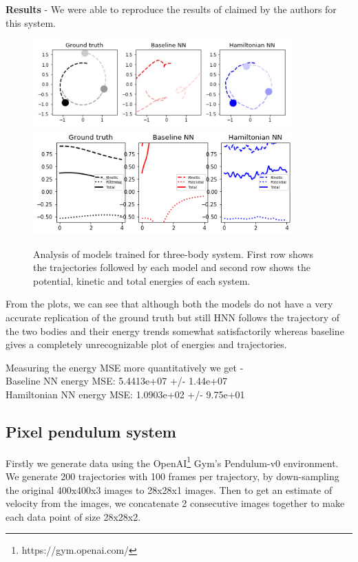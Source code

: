 \textbf{Results} - We were able to reproduce the results of claimed by the authors for this system.
\begin{figure}[htp]
    \centering
    \includegraphics[width=10cm]{../openreview/3_trajectory.png}
    \includegraphics[width=10cm]{../openreview/3_energy.png}
    \caption{Analysis of models trained for three-body system. First row shows the trajectories followed by each model and second row shows the potential, kinetic and total energies of each system.}
    \label{fig:galaxy}
\end{figure}

From the plots, we can see that although both the models do not have a very accurate replication of the ground truth but still HNN follows the trajectory of the two bodies and their energy trends somewhat satisfactorily whereas baseline gives a completely unrecognizable plot of energies and trajectories.

Measuring the energy MSE more quantitatively we get -\\
Baseline NN energy MSE: 5.4413e+07 +/- 1.44e+07\\
Hamiltonian NN energy MSE: 1.0903e+02 +/- 9.75e+01

\subsection{Pixel pendulum system}
Firstly we generate data using the OpenAI\footnote{https://gym.openai.com/} Gym's Pendulum-v0 environment. We generate 200 trajectories with 100 frames per trajectory, by down-sampling the original 400x400x3 images to 28x28x1 images. Then to get an estimate of velocity from the images, we concatenate 2 consecutive images together to make each data point of size 28x28x2. 


